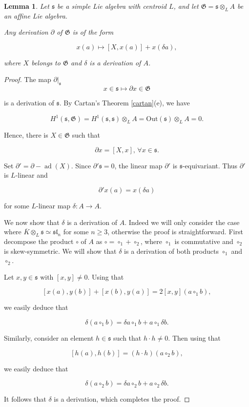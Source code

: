\documentclass[11pt, letterpaper, reqno]{amsart}
\newtheorem{lemma}[theorem]{Lemma}
\theoremstyle{definition}
\newcommand{\ad}{\operatorname{ad}}
\newcommand{\fsl}{\mathfrak{sl}}
\newcommand{\fs}{\mathfrak{s}}
\newcommand{\fG}{\mathfrak{G}}
\newcommand{\Out}{\mathrm{Out}}
\begin{document}
\begin{lemma}\label{der} Let $\fs$ be a simple Lie algebra 
with centroid $L$, and let 
$\fG=\fs\otimes_L A$ be an affine Lie algebra.

Any derivation $\partial$ of $\fG$ is of the form

$$x(a)\mapsto [X,x(a)] + x(\delta a),$$

\noindent where $X$ belongs to $\fG$ and
$\delta$ is a derivation of $A$.
\end{lemma}

\begin{proof} 

The map $\partial\vert_{\fs}$
$$x\in \fs\mapsto \partial x\in\fG$$

\noindent is a derivation of $\fs$. By Cartan's Theorem \ref{cartan}(e), we have

$$H^1(\fs,\fG)=H^1(\fs,\fs)\otimes_L A=
\Out(\fs)\otimes_L A=0.$$

\noindent Hence, there is $X\in\fG$ such that

$$\partial x=[X,x], \, \forall x\in\fs.$$

\noindent Set $\partial'=\partial-\ad(X)$. 
Since $\partial'\fs=0$, the linear map 
$\partial'$ is $\fs$-equivariant. Thus
$\partial'$ is $L$-linear and 

$$\partial' x(a)=x(\delta a)$$ 

\noindent for some 
$L$-linear map $\delta:A\to A$.

We now show that  $\delta$ is a derivation of
$A$. Indeed 
we will only consider the case where  
$\overline{K}\otimes_L\fs\simeq\fsl_n$ for some $n\geq 3$, otherwise the proof is straightforward. First decompose the product $\circ$ of $A$ as $\circ=\circ_1+\circ_2$, where $\circ_1$ is commutative and $\circ_2$ is skew-symmetric. We will show that $\delta$ is a derivation of both products $\circ_1$ and $\circ_2$.

Let $x,y\in \fs$ with $[x,y]\neq 0$. Using
that 

$$[x(a),y(b)]+[x(b),y(a)]=2[x,y](a\circ_1 b),$$

\noindent we easily deduce that 

$$\delta(a\circ_1 b)=
\delta a\circ_1 b+a\circ_1 \delta b.$$

Similarly, consider an element $h\in \fs$ such that $h\cdot h\neq 0$. Then using that

$$[h(a),h(b)]=(h\cdot h)(a\circ_2 b),$$

\noindent we easily deduce that 

$$\delta(a\circ_2 b)=
\delta a\circ_2 b+a\circ_2 \delta b.$$

\noindent It follows that $\delta$ is a derivation, which completes the proof.
\end{proof}
\end{document}
